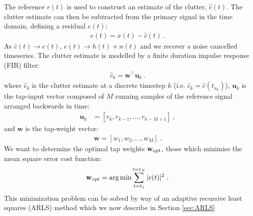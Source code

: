 \documentclass[pra,superscriptaddress,reprint,amsmath,amssymb,nofootinbib]{revtex4-2}
\begin{document}
The reference  $r(t)$ is used to construct an estimate of the clutter, $\hat{c}(t)$. The clutter estimate can then be subtracted from the primary signal in the time domain, defining a residual $e(t)$:
\begin{eqnarray}
	e(t) = x(t) - \hat{c}(t) \ .\label{eq:error_estimate}
\end{eqnarray}
As $\hat{c}(t) \to c(t)$, 	$e(t) \to h(t) + n(t)$ and we recover a noise cancelled timeseries. The clutter estimate is modelled by a finite duration impulse response (FIR) filter:
\begin{eqnarray}
	\hat{c}_k = \mathbf{w}^{\intercal}\mathbf{u}_k \ . \label{clutter_estimate}
\end{eqnarray}
where $\hat{c}_k$ is the clutter estimate at a discrete timestep $k$ (i.e. $\hat{c}_k = \hat{c}(t_{n_k})$), $\mathbf{u}_k$ is the tap-input vector composed of $M$ running samples of the reference signal arranged backwards in time:
 \begin{eqnarray}
 	\mathbf{u}_k &= [r_k, r_{k-1}, \dots, r_{k-M+1}] \ ,
 \end{eqnarray}
and $\mathbf{w}$ is the tap-weight vector:
 \begin{eqnarray}
	\mathbf{w} = [w_1, w_{2}, \dots, w_{M}] \ .
\end{eqnarray}
We want to determine the optimal tap weights $\mathbf{w}_{\rm opt}$, those which minimise the mean square error cost function:
\begin{eqnarray}
	\mathbf{w}_{\rm opt} = \arg \min \sum_{t=t_1}^{t=t_{N}} |e(t)|^2 \ .
\end{eqnarray}
This minimization problem can be solved by way of an adaptive recursive least squares (ARLS) method which we now describe in Section \ref{sec:ARLS}
\end{document}
